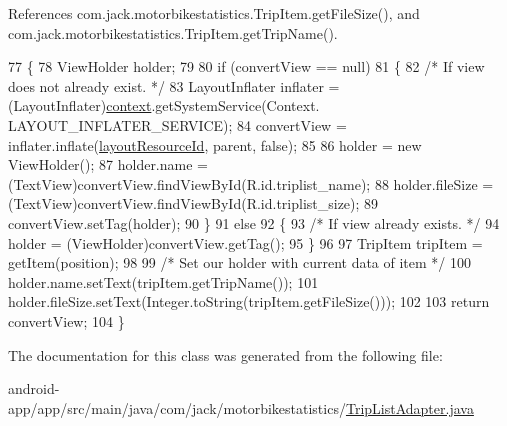 References com.\+jack.\+motorbikestatistics.\+Trip\+Item.\+get\+File\+Size(), and com.\+jack.\+motorbikestatistics.\+Trip\+Item.\+get\+Trip\+Name().


\begin{DoxyCode}
77                                                                           \{
78         ViewHolder holder;
79 
80         \textcolor{keywordflow}{if} (convertView == null)
81         \{
82             \textcolor{comment}{/* If view does not already exist. */}
83             LayoutInflater inflater = (LayoutInflater)\hyperlink{classcom_1_1jack_1_1motorbikestatistics_1_1_trip_list_adapter_abe987d1818dcbad467b56142acb55447}{context}.getSystemService(Context.
      LAYOUT\_INFLATER\_SERVICE);
84             convertView = inflater.inflate(\hyperlink{classcom_1_1jack_1_1motorbikestatistics_1_1_trip_list_adapter_a72f8d17ad7f1dc531cbe0015b2f29454}{layoutResourceId}, parent, \textcolor{keyword}{false});
85 
86             holder = \textcolor{keyword}{new} ViewHolder();
87             holder.name = (TextView)convertView.findViewById(R.id.triplist\_name);
88             holder.fileSize = (TextView)convertView.findViewById(R.id.triplist\_size);
89             convertView.setTag(holder);
90         \}
91         \textcolor{keywordflow}{else}
92         \{
93             \textcolor{comment}{/* If view already exists. */}
94             holder = (ViewHolder)convertView.getTag();
95         \}
96 
97         TripItem tripItem = getItem(position);
98 
99         \textcolor{comment}{/* Set our holder with current data of item */}
100         holder.name.setText(tripItem.getTripName());
101         holder.fileSize.setText(Integer.toString(tripItem.getFileSize()));
102 
103         \textcolor{keywordflow}{return} convertView;
104     \}
\end{DoxyCode}


The documentation for this class was generated from the following file\+:\begin{DoxyCompactItemize}
\item 
android-\/app/app/src/main/java/com/jack/motorbikestatistics/\hyperlink{_trip_list_adapter_8java}{Trip\+List\+Adapter.\+java}\end{DoxyCompactItemize}
